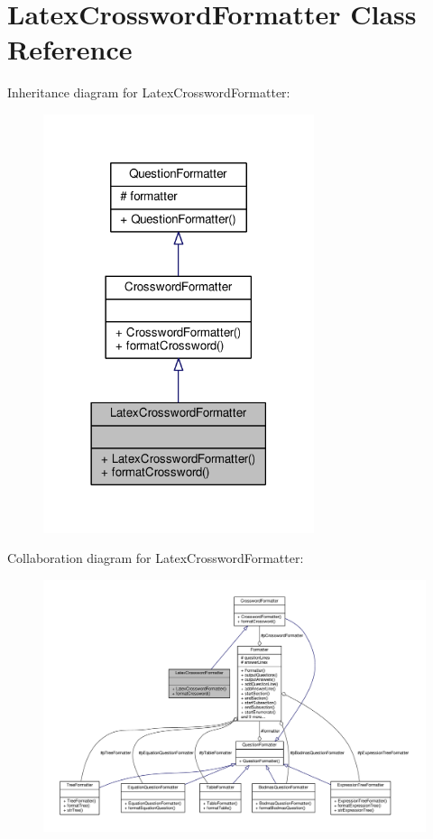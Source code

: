 \hypertarget{classLatexCrosswordFormatter}{}\section{Latex\+Crossword\+Formatter Class Reference}
\label{classLatexCrosswordFormatter}


Inheritance diagram for Latex\+Crossword\+Formatter\+:
\nopagebreak
\begin{figure}[H]
\begin{center}
\leavevmode
\includegraphics[width=225pt]{classLatexCrosswordFormatter__inherit__graph}
\end{center}
\end{figure}


Collaboration diagram for Latex\+Crossword\+Formatter\+:
\nopagebreak
\begin{figure}[H]
\begin{center}
\leavevmode
\includegraphics[width=350pt]{classLatexCrosswordFormatter__coll__graph}
\end{center}
\end{figure}
